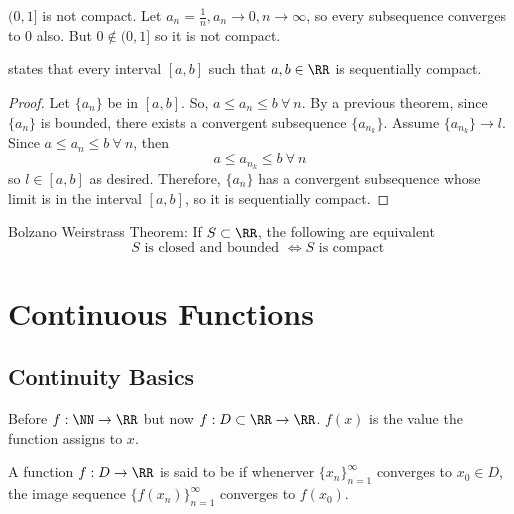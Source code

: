\documentclass[12pt]{scrartcl}
\begin{document}
\begin{example}
  $(0, 1]$ is not compact. Let $a_n = \frac{1}{n}, a_n\to 0, n\to\infty$, so every subsequence 
  converges to 0 also. But $0 \notin (0, 1]$ so it is not compact. 
\end{example}

\begin{theorem}
   states that every interval $[a, b]$ such
  that $a, b \in \RR$ is sequentially compact. 

  \begin{proof}
    Let $\{a_n\}$ be in $[a, b]$. So, $a \leq a_n \leq b \ \forall \ n$. By a previous theorem, 
    since $\{a_n\}$ is bounded, there exists a convergent subsequence $\{a_{n_k}\}$. Assume 
    $\{a_{n_k}\} \to l$. Since $a \leq a_n \leq b \ \forall \ n$, then 
    \[a \leq a_{n_k} \leq b \ \forall \ n\]
    so $l \in [a, b]$ as desired. Therefore, $\{a_n\}$ has a convergent subsequence whose limit 
    is in the interval $[a, b]$, so it is sequentially compact.
  \end{proof}
\end{theorem}

\begin{theorem}
  Bolzano Weirstrass Theorem: If $S \subset \RR$, the following are equivalent 
  \[S \text{ is closed and bounded } \Longleftrightarrow S \text{ is compact }\]
\end{theorem}

\section{Continuous Functions}

\subsection{Continuity Basics}

\begin{note}
  Before $f: \NN \to \RR$ but now $f: D \subset \RR \to \RR$. $f(x)$ is the value the function
  assigns to $x$. 
\end{note}

\begin{definition}
  A function $f: D \to\RR$ is said to be  if whenerver 
  $\{x_n\}_{n=1}^\infty$ converges to $x_0 \in D$, the image sequence $\{f(x_n)\}_{n=1}^\infty$ 
  converges to $f(x_0)$.
\end{definition}
\end{document}
